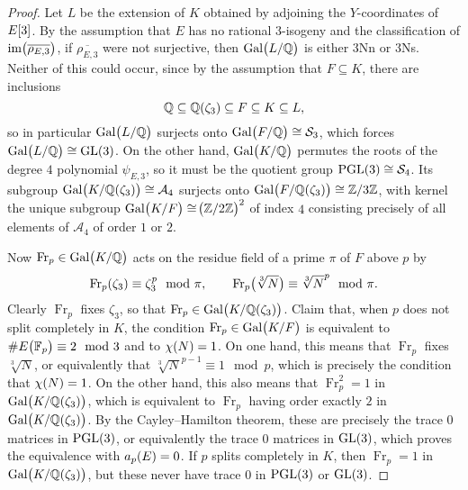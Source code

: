 \documentclass{article}
\theoremstyle{plain}
\theoremstyle{definition}
\newcommand{\AAA}{\mathcal{A}}
\newcommand{\FF}{\mathbb{F}}
\newcommand{\Fr}{\operatorname{Fr}}
\newcommand{\Gal}{\operatorname{Gal}}
\newcommand{\GL}{\operatorname{GL}}
\newcommand{\im}{\operatorname{im}}
\newcommand{\PGL}{\operatorname{PGL}}
\newcommand{\QQ}{\mathbb{Q}}
\newcommand{\SSS}{\mathcal{S}}
\newcommand{\ZZ}{\mathbb{Z}}
\newcommand{\br}{\!\del}
\begin{document}
\begin{proof}
Let $ L $ be the extension of $ K $ obtained by adjoining the $ Y $-coordinates of $ E\sbr{3} $. By the assumption that $ E $ has no rational $ 3 $-isogeny and the classification of $ \im\br{\overline{\rho_{E, 3}}} $, if $ \overline{\rho_{E, 3}} $ were not surjective, then $ \Gal\br{L / \QQ} $ is either 3Nn or 3Ns. Neither of this could occur, since by the assumption that $ F \subseteq K $, there are inclusions
$$ \QQ \subseteq \QQ\br{\zeta_3} \subseteq F \subseteq K \subseteq L, $$
so in particular $ \Gal\br{L / \QQ} $ surjects onto $ \Gal\br{F / \QQ} \cong \SSS_3 $, which forces $ \Gal\br{L / \QQ} \cong \GL\br{3} $. On the other hand, $ \Gal\br{K / \QQ} $ permutes the roots of the degree $ 4 $ polynomial $ \psi_{E, 3} $, so it must be the quotient group $ \PGL\br{3} \cong \SSS_4 $. Its subgroup $ \Gal\br{K / \QQ\br{\zeta_3}} \cong \AAA_4 $ surjects onto $ \Gal\br{F / \QQ\br{\zeta_3}} \cong \ZZ / 3\ZZ $, with kernel the unique subgroup $ \Gal\br{K / F} \cong \br{\ZZ / 2\ZZ}^2 $ of index $ 4 $ consisting precisely of all elements of $ \AAA_4 $ of order $ 1 $ or $ 2 $.

\pagebreak

Now $ \Fr_p \in \Gal\br{K / \QQ} $ acts on the residue field of a prime $ \pi $ of $ F $ above $ p $ by
$$ \Fr_p\br{\zeta_3} \equiv \zeta_3^p \mod \pi, \qquad \Fr_p\br[1]{\sqrt[3]{N}} \equiv \sqrt[3]{N}^p \mod \pi. $$
Clearly $ \Fr_p $ fixes $ \zeta_3 $, so that $ \Fr_p \in \Gal\br{K / \QQ\br{\zeta_3}} $. Claim that, when $ p $ does not split completely in $ K $, the condition $ \Fr_p \in \Gal\br{K / F} $ is equivalent to $ \#E\br{\FF_p} \equiv 2 \mod 3 $ and to $ \chi\br{N} = 1 $. On one hand, this means that $ \Fr_p $ fixes $ \sqrt[3]{N} $, or equivalently that $ \sqrt[3]{N}^{p - 1} \equiv 1 \mod p $, which is precisely the condition that $ \chi\br{N} = 1 $. On the other hand, this also means that $ \Fr_p^2 = 1 $ in $ \Gal\br{K / \QQ\br{\zeta_3}} $, which is equivalent to $ \Fr_p $ having order exactly $ 2 $ in $ \Gal\br{K / \QQ\br{\zeta_3}} $. By the Cayley--Hamilton theorem, these are precisely the trace $ 0 $ matrices in $ \PGL\br{3} $, or equivalently the trace $ 0 $ matrices in $ \GL\br{3} $, which proves the equivalence with $ a_p\br{E} = 0 $. If $ p $ splits completely in $ K $, then $ \Fr_p = 1 $ in $ \Gal\br{K / \QQ\br{\zeta_3}} $, but these never have trace $ 0 $ in $ \PGL\br{3} $ or $ \GL\br{3} $.
\end{proof}
\end{document}
